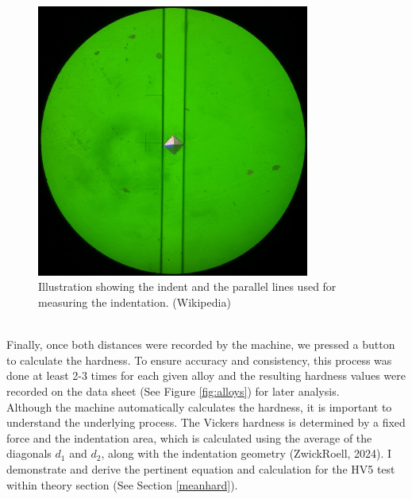 \documentclass{article}
\begin{document}
\begin{minipage}{0.4\textwidth}\centering
\begin{figure}[H]
    \centering
    \includegraphics[width=0.8\textwidth]{images/1024px-Vicker_Hardness_-_Diamond_Indentation.jpg}
    \caption{Illustration showing the indent and the parallel lines used for measuring the indentation. (Wikipedia)}
    \label{fig:vickers}
\end{figure}
\end{minipage}\\[8pt]Finally, once both distances were recorded by the machine, we pressed a button to calculate the hardness.
\newpage{}
To ensure accuracy and consistency, this process was done at least 2-3 times for each given alloy and the resulting hardness values were recorded on the data sheet (See Figure \ref{fig:alloys}) for later analysis.\\[8pt]
Although the machine automatically calculates the hardness, it is important to understand the underlying process. The Vickers hardness is determined by a fixed force and the indentation area, which is calculated using the average of the diagonals $d_1$ and $d_2$, along with the indentation geometry (ZwickRoell, 2024). I demonstrate and derive the pertinent equation and calculation for the HV5 test within theory section (See Section \ref{meanhard}).\\[8pt]
\end{document}
